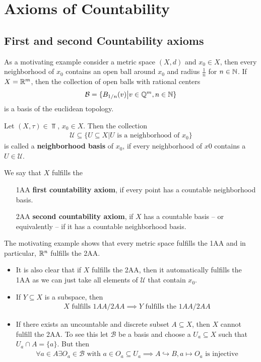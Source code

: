 \section{Axioms of Countability}
\subsection{First and second Countability axioms}


As a motivating example consider a metric space $(X,d)$ and $x_0 \in X$, then every neighborhood of $x_0$ contains an open ball around $x_0$ and radius $\tfrac{1}{n}$ for $n \in \mathbb{N}$.
If $X = \mathbb{R}^{m}$, then the collection of open balls with rational centers
\begin{align*}
  \mathcal{B} = \{B_{1/n}(v) \big\vert v\in \mathbb{Q}^{m}, n \in \mathbb{N}\}
\end{align*}
is a basis of the euclidean topology.



\begin{dfn}[]
  Let $(X,\tau) \in \Top$, $x_0 \in X$. Then the collection
  \begin{align*}
    \mathcal{U} \subseteq \{U \subseteq X \big\vert U \text{ is a neighborhood of }x_0\}
  \end{align*}
  is called a \textbf{neighborhood basis} of $x_0$, if every neighborhood of $x0$ contains a $U \in \mathcal{U}$.

  We say that $X$ fulfills the 
  \begin{itemize}
    \item[1AA] \textbf{first countability axiom}, if every point has a countable neighborhood basis.
    \item[2AA] \textbf{second countability axiom}, if $X$ has a countable basis -- or equivalently -- if it has a countable neighborhood basis.
  \end{itemize}
\end{dfn}

  The motivating example shows that every metric space fulfills the 1AA and in particular, $\mathbb{R}^{n}$ fulfills the 2AA.
\begin{itemize}
  \item It is also clear that if $X$ fulfills the 2AA, then it automatically fulfills the 1AA as we can just take all elements of $\mathcal{U}$ that contain $x_0$.
  \item If $Y \subseteq X$ is a subspace, then 
    \begin{align*}
      X \text{ fulfills } 1AA/2AA \implies Y \text{ fulfills the } 1AA/2AA
    \end{align*}
  \item If there exists an uncountable and discrete subset $A \subseteq X$, then $X$ cannot fulfill the 2AA.
    To see this let $\mathcal{B}$ be a basis and choose a $U_a \subseteq X$ such that $U_a \cap A = \{a\}$. But then
    \begin{align*}
      \forall a \in A \exists O_a \in \mathcal{B} \text{ with } a \in O_a \subseteq U_a \implies A \hookrightarrow B, a \mapsto O_a \text{ is injective}
    \end{align*}
\end{itemize}

